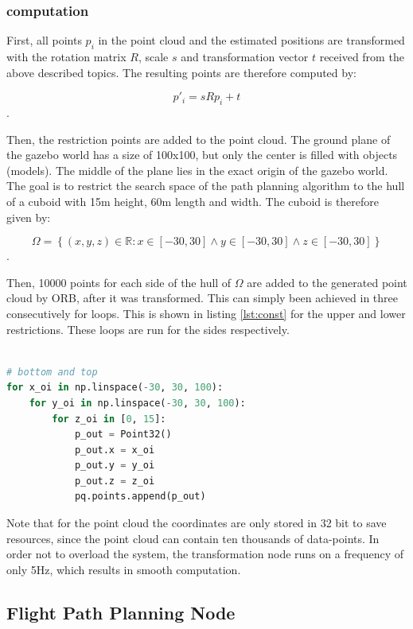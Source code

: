 	\subsubsection{computation}
	
	First, all points $p_i$ in the point cloud and the estimated positions are transformed with the rotation matrix $R$, scale $s$ and transformation vector $t$ received 
	from the above described topics. The resulting points are therefore computed by: 
	
	$$p'_i = sRp_i + t$$.
	
	Then, the restriction points are added to the point cloud.
	The ground plane of the gazebo world has a size of 100x100, but only the center is filled with objects (models). The middle of the plane 
	lies in the exact origin of the gazebo world. The goal is to restrict the search space of the path planning algorithm to the hull of a cuboid with 15m
	height, 60m length and width. The cuboid is therefore given by: 
	
	$$\Omega = \left\{(x, y, z) \in \mathbb{R} : x \in \left[-30, 30\right] \land y \in \left[-30, 30\right] \land z \in \left[-30, 30\right] \right\}$$.
	
	Then, 10000 points for each side of the hull of $\Omega$ are added to the generated point cloud by ORB, after it was transformed. This can simply been achieved 
	in three consecutively for loops. This is shown in listing \ref{lst:const} for the upper and lower restrictions. These loops are run for the sides respectively. 
	
	\begin{lstlisting}[language=python, caption= Adding upper and lower restrictions to point cloud. , label=lst:const]
	
# bottom and top 
for x_oi in np.linspace(-30, 30, 100): 
	for y_oi in np.linspace(-30, 30, 100): 
		for z_oi in [0, 15]: 
			p_out = Point32()
			p_out.x = x_oi
			p_out.y = y_oi
			p_out.z = z_oi
			pq.points.append(p_out)

	\end{lstlisting}

	Note that for the point cloud the coordinates are only stored in 32 bit to save resources, since the point cloud can contain ten thousands of data-points. In order not 
	to overload the system, the transformation node runs on a frequency of only 5Hz, which results in smooth computation. 
	
	\subsection{Flight Path Planning Node} \label{path}
	
